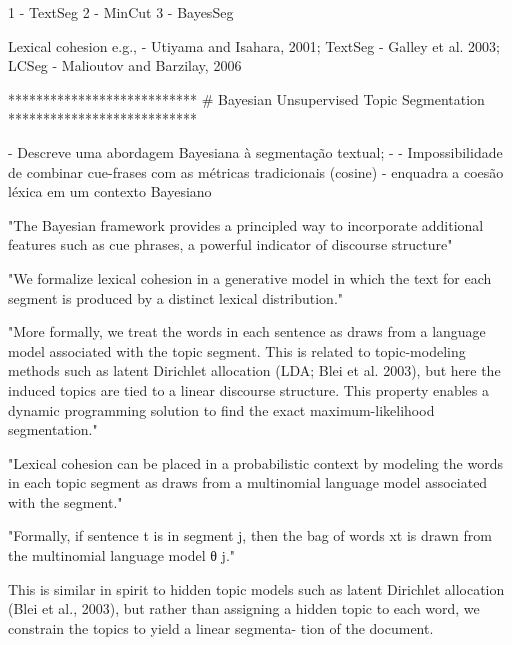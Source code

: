 



1 - TextSeg
2 - MinCut
3 - BayesSeg





Lexical cohesion e.g., 
	- Utiyama and Isahara,     2001; {TextSeg}
	- Galley et al.            2003; {LCSeg}
	- Malioutov and Barzilay,  2006  {}





***************************
# Bayesian Unsupervised Topic Segmentation
***************************

- Descreve uma abordagem Bayesiana à segmentação textual;
- 
- Impossibilidade de combinar cue-frases com as métricas tradicionais (cosine)
- {enquadra a coesão léxica em um contexto Bayesiano}

"The Bayesian framework provides a principled way to incorporate additional features such as cue phrases, a powerful indicator of discourse structure"


"We formalize lexical cohesion in a generative model in which the text for each segment is produced by a distinct lexical distribution." 


"More formally, we treat the words in each sentence as draws from a language model associated with the topic segment. This is related to topic-modeling methods such as latent Dirichlet allocation (LDA; Blei et al. 2003), but here the induced topics are tied to a linear discourse structure. This property enables a dynamic programming solution to find the exact maximum-likelihood segmentation." 



"Lexical cohesion can be placed in a probabilistic context by modeling the words in each topic segment as draws from a multinomial language model associated with the segment."

"Formally, if sentence t is in segment j, then the bag of words xt is drawn from the multinomial language model θ j."


	This is similar in spirit to hidden topic models such
	as latent Dirichlet allocation (Blei et al., 2003), but
	rather than assigning a hidden topic to each word,
	we constrain the topics to yield a linear segmenta-
	tion of the document.

